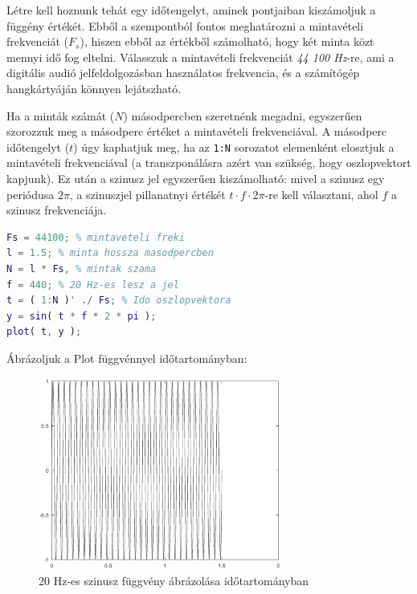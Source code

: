 \documentclass[12pt,a4paper]{article}
\begin{document}
Létre kell hoznunk tehát egy időtengelyt, aminek pontjaiban kiszámoljuk a függény értékét. Ebből a szempontból fontos meghatározni a mintavételi frekvenciát ($F_s$), hiszen ebből az értékből számolható, hogy két minta közt mennyi idő fog eltelni. Válasszuk a mintavételi frekvenciát \textit{44 100 Hz}-re, ami a digitális audió jelfeldolgozásban használatos frekvencia, és a számítógép hangkártyáján könnyen lejátszható.

Ha a minták számát ($N$) másodpercben szeretnénk megadni, egyszerűen szorozzuk meg a másodperc értéket a mintavételi frekvenciával. A másodperc időtengelyt ($t$) úgy kaphatjuk meg, ha az \texttt{1:N} sorozatot elemenként elosztjuk a mintavételi frekvenciával (a transzponálásra azért van szükség, hogy oszlopvektort kapjunk). Ez után a szinusz jel egyszerűen kiszámolható: mivel a szinusz egy periódusa $2\pi$, a szinuszjel pillanatnyi értékét $t \cdot f \cdot 2\pi$-re kell választani, ahol $f$ a szinusz frekvenciája.

\begin{lstlisting}[frame=single,language=matlab,caption=Mintavételi frekvencia beállítása és szinuszjel előállítása]
Fs = 44100; % mintaveteli freki
l = 1.5; % minta hossza masodpercben
N = l * Fs, % mintak szama
f = 440; % 20 Hz-es lesz a jel
t = ( 1:N )' ./ Fs; % Ido oszlopvektora
y = sin( t * f * 2 * pi );
plot( t, y );
\end{lstlisting}

Ábrázoljuk a Plot függvénnyel időtartományban:

\begin{figure}[H]
\begin{center}
\includegraphics[width=8cm]{figures/modulaciok_workshop_szinusz.eps}
\caption{20 Hz-es szinusz függvény ábrázolása időtartományban}
\label{fig:szinusz}
\end{center}
\end{figure}
\end{document}
